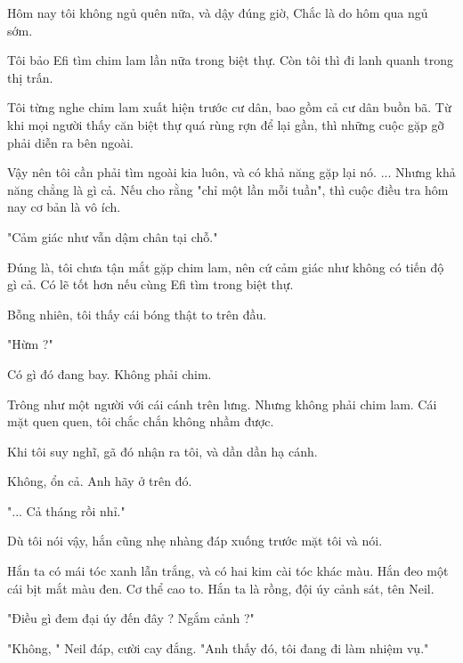 
Hôm nay tôi không ngủ quên nữa, và dậy đúng giờ, Chắc là do hôm qua ngủ sớm.

Tôi bảo Efi tìm chim lam lần nữa trong biệt thự. Còn tôi thì đi lanh quanh trong thị trấn.

Tôi từng nghe chim lam xuất hiện trước cư dân, bao gồm cả cư dân buồn bã. Từ khi mọi người thấy căn biệt thự quá rùng rợn để lại gần, thì những cuộc gặp gỡ phải diễn ra bên ngoài.

Vậy nên tôi cần phải tìm ngoài kia luôn, và có khả năng gặp lại nó. ... Nhưng khả năng chẳng là gì cả. Nếu cho rằng "chỉ một lần mỗi tuần", thì cuộc điều tra hôm nay cơ bản là vô ích.

"Cảm giác như vẫn dậm chân tại chỗ." 

Đúng là, tôi chưa tận mắt gặp chim lam, nên cứ cảm giác như không có tiến độ gì cả. Có lẽ tốt hơn nếu cùng Efi tìm trong biệt thự.

Bỗng nhiên, tôi thấy cái bóng thật to trên đầu.

"Hừm ?"

Có gì đó đang bay. Không phải chim.

Trông như một người với cái cánh trên lưng. Nhưng không phải chim lam. Cái mặt quen quen, tôi chắc chắn không nhầm được.

Khi tôi suy nghĩ, gã đó nhận ra tôi, và dần dần hạ cánh.

Không, ổn cả. Anh hãy ở trên đó.

"... Cả tháng rồi nhỉ."

Dù tôi nói vậy, hắn cũng nhẹ nhàng đáp xuống trước mặt tôi và nói.

Hắn ta có mái tóc xanh lẫn trắng, và có hai kim cài tóc khác màu. Hắn đeo một cái bịt mắt màu đen. Cơ thể cao to. Hắn ta là rồng, đội úy cảnh sát, tên Neil.

"Điều gì đem đại úy đến đây ? Ngắm cảnh ?"

"Không, " Neil đáp, cười cay đắng. "Anh thấy đó, tôi đang đi làm nhiệm vụ."

